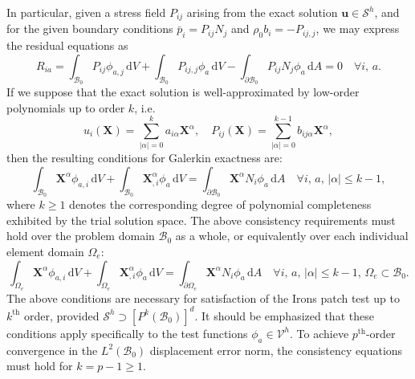In particular, given a stress field $P_{ij}$ arising from the exact solution $\bm{u} \in \mathcal{S}^h$, and for the given boundary conditions $\bar{p}_i = P_{ij} N_j$ and $\rho_0 b_i = - P_{ij,j}$, we may express the residual equations as
\begin{equation}
	R_{ia} = \int_{\mathcal{B}_0} P_{ij} \phi_{a,j} \, \mathrm dV + \int_{\mathcal{B}_0} P_{ij,j} \phi_a \, \mathrm dV - \int_{\partial \mathcal{B}_0} P_{ij} N_j \phi_a \, \mathrm dA = 0 \quad \forall i, \, a.
\end{equation}
If we suppose that the exact solution is well-approximated by low-order polynomials up to order $k$, i.e.
\begin{equation}
  u_{i} (\bm{X}) = \sum_{|\alpha| = 0}^{k} a_{i\alpha} \bm{X}^\alpha, \quad P_{ij} (\bm{X}) = \sum_{|\alpha| = 0}^{k-1} b_{ij\alpha} \bm{X}^\alpha,
\end{equation}
then the resulting conditions for Galerkin exactness are:
\begin{equation}
  \int_{\mathcal{B}_0} \bm{X}^{\alpha} \phi_{a,i} \, \mathrm dV + \int_{\mathcal{B}_0} \bm{X}^{\alpha}_{,i} \phi_a \, \mathrm dV = \int_{\partial \mathcal{B}_0} \bm{X}^{\alpha} N_i \phi_a \, \mathrm dA \quad \forall i, \, a, \, | \alpha | \leq k-1,
\end{equation}
where $k \geq 1$ denotes the corresponding degree of polynomial completeness exhibited by the trial solution space. The above consistency requirements must hold over the problem domain $\mathcal{B}_0$ as a whole, or equivalently over each individual element domain $\Omega_e$:
\begin{equation}
  \int_{\Omega_e} \bm{X}^{\alpha} \phi_{a,i} \, \mathrm dV + \int_{\Omega_e} \bm{X}^{\alpha}_{,i} \phi_a \, \mathrm dV = \int_{\partial \Omega_e} \bm{X}^{\alpha} N_i \phi_a \, \mathrm dA \quad \forall i, \, a, \, | \alpha | \leq k-1, \, \Omega_e \subset \mathcal{B}_0.
  \label{eq:consistency}
\end{equation}
The above conditions are necessary for satisfaction of the Irons patch test up to $k^{\text{th}}$ order, provided $\mathcal{S}^h \supset [ P^{k} (\mathcal{B}_0) ]^d$. It should be emphasized that these conditions apply specifically to the test functions $\phi_a \in \mathcal{V}^h$. To achieve $p^{\text{th}}$-order convergence in the $L^2 (\mathcal{B}_0)$ displacement error norm, the consistency equations must hold for $k = p-1 \geq 1$.

